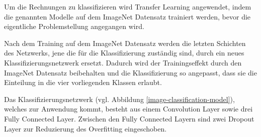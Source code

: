 Um die Rechnungen zu klassifizieren wird Transfer Learning angewendet, indem die genannten Modelle auf dem ImageNet Datensatz trainiert werden, bevor die eigentliche Problemstellung angegangen wird.

Nach dem Training auf dem ImageNet Datensatz werden die letzten Schichten des Netzwerks, jene die für die Klassifizierung zuständig sind, durch ein neues Klassifizierungsnetzwerk ersetzt. Dadurch wird der Trainingseffekt durch den ImageNet Datensatz beibehalten und die Klassifizierung so angepasst, dass sie die Einteilung in die vier vorliegenden Klassen erlaubt.

Das Klassifizierungsnetzwerk (vgl. Abbildung \ref{image-classification-model}), welches zur Anwendung kommt, besteht aus einem Convolution Layer sowie drei Fully Connected Layer. Zwischen den Fully Connected Layern sind zwei Dropout Layer zur Reduzierung des Overfitting eingeschoben.


